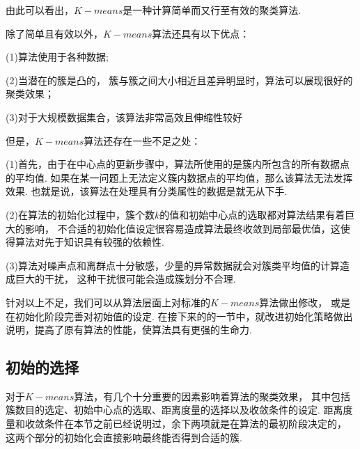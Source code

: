 \documentclass[bachelor,adobefonts]{jnuthesis}
\begin{document}
由此可以看出，$K-means$是一种计算简单而又行至有效的聚类算法.

除了简单且有效以外，$K-means$算法还具有以下优点：

(1)算法使用于各种数据;

(2)当潜在的簇是凸的，
簇与簇之间大小相近且差异明显时，算法可以展现很好的聚类效果；

(3)对于大规模数据集合，该算法非常高效且伸缩性较好

但是，$K-means$算法还存在一些不足之处：

(1)首先，由于在中心点的更新步骤中，算法所使用的是簇内所包含的所有数据点的平均值.
如果在某一问题上无法定义簇内数据点的平均值，那么该算法无法发挥效果.
也就是说，该算法在处理具有分类属性的数据是就无从下手.

(2)在算法的初始化过程中，簇个数$k$的值和初始中心点的选取都对算法结果有着巨大的影响，
不合适的初始化值设定很容易造成算法最终收敛到局部最优值，这使得算法对先于知识具有较强的依赖性.

(3)算法对噪声点和离群点十分敏感，少量的异常数据就会对簇类平均值的计算造成巨大的干扰，
这种干扰很可能会造成簇划分不合理.

针对以上不足，我们可以从算法层面上对标准的$K-means$算法做出修改，
或是在初始化阶段完善对初始值的设定.
在接下来的的一节中，就改进初始化策略做出说明，提高了原有算法的性能，使算法具有更强的生命力.


\subsection{初始的选择}
对于$K-means$算法，有几个十分重要的因素影响着算法的聚类效果，
其中包括簇数目的选定、初始中心点的选取、距离度量的选择以及收敛条件的设定.
距离度量和收敛条件在本节之前已经说明过，余下两项就是在算法的最初阶段决定的，
这两个部分的初始化会直接影响最终能否得到合适的簇.
\end{document}
